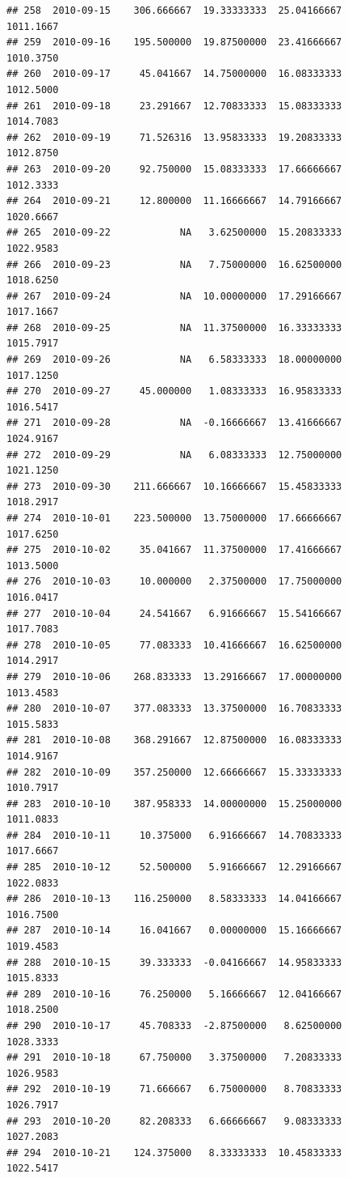 \documentclass[
]{article}
\begin{document}
\begin{verbatim}
## 258  2010-09-15    306.666667  19.33333333  25.04166667    1011.1667
## 259  2010-09-16    195.500000  19.87500000  23.41666667    1010.3750
## 260  2010-09-17     45.041667  14.75000000  16.08333333    1012.5000
## 261  2010-09-18     23.291667  12.70833333  15.08333333    1014.7083
## 262  2010-09-19     71.526316  13.95833333  19.20833333    1012.8750
## 263  2010-09-20     92.750000  15.08333333  17.66666667    1012.3333
## 264  2010-09-21     12.800000  11.16666667  14.79166667    1020.6667
## 265  2010-09-22            NA   3.62500000  15.20833333    1022.9583
## 266  2010-09-23            NA   7.75000000  16.62500000    1018.6250
## 267  2010-09-24            NA  10.00000000  17.29166667    1017.1667
## 268  2010-09-25            NA  11.37500000  16.33333333    1015.7917
## 269  2010-09-26            NA   6.58333333  18.00000000    1017.1250
## 270  2010-09-27     45.000000   1.08333333  16.95833333    1016.5417
## 271  2010-09-28            NA  -0.16666667  13.41666667    1024.9167
## 272  2010-09-29            NA   6.08333333  12.75000000    1021.1250
## 273  2010-09-30    211.666667  10.16666667  15.45833333    1018.2917
## 274  2010-10-01    223.500000  13.75000000  17.66666667    1017.6250
## 275  2010-10-02     35.041667  11.37500000  17.41666667    1013.5000
## 276  2010-10-03     10.000000   2.37500000  17.75000000    1016.0417
## 277  2010-10-04     24.541667   6.91666667  15.54166667    1017.7083
## 278  2010-10-05     77.083333  10.41666667  16.62500000    1014.2917
## 279  2010-10-06    268.833333  13.29166667  17.00000000    1013.4583
## 280  2010-10-07    377.083333  13.37500000  16.70833333    1015.5833
## 281  2010-10-08    368.291667  12.87500000  16.08333333    1014.9167
## 282  2010-10-09    357.250000  12.66666667  15.33333333    1010.7917
## 283  2010-10-10    387.958333  14.00000000  15.25000000    1011.0833
## 284  2010-10-11     10.375000   6.91666667  14.70833333    1017.6667
## 285  2010-10-12     52.500000   5.91666667  12.29166667    1022.0833
## 286  2010-10-13    116.250000   8.58333333  14.04166667    1016.7500
## 287  2010-10-14     16.041667   0.00000000  15.16666667    1019.4583
## 288  2010-10-15     39.333333  -0.04166667  14.95833333    1015.8333
## 289  2010-10-16     76.250000   5.16666667  12.04166667    1018.2500
## 290  2010-10-17     45.708333  -2.87500000   8.62500000    1028.3333
## 291  2010-10-18     67.750000   3.37500000   7.20833333    1026.9583
## 292  2010-10-19     71.666667   6.75000000   8.70833333    1026.7917
## 293  2010-10-20     82.208333   6.66666667   9.08333333    1027.2083
## 294  2010-10-21    124.375000   8.33333333  10.45833333    1022.5417

\end{verbatim}
\end{document}
